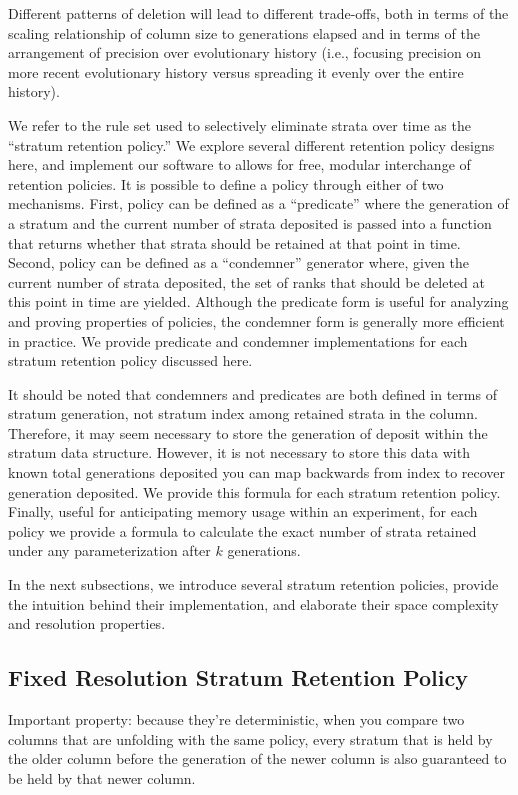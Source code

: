Different patterns of deletion will lead to different trade-offs, both in terms of the scaling relationship of column size to generations elapsed and in terms of the arrangement of precision over evolutionary history (i.e., focusing precision on more recent evolutionary history versus spreading it evenly over the entire history).

We refer to the rule set used to selectively eliminate strata over time as the ``stratum retention policy.''
We explore several different retention policy designs here, and implement our software to allows for free, modular interchange of retention policies.
It is possible to define a policy through either of two mechanisms.
First, policy can be defined as a ``predicate'' where the generation of a stratum and the current number of strata deposited is passed into a function that returns whether that strata should be retained at that point in time.
Second, policy can be defined as a ``condemner'' generator where, given the current number of strata deposited, the set of ranks that should be deleted at this point in time are yielded.
Although the predicate form is useful for analyzing and proving properties of policies, the condemner form is generally more efficient in practice.
We provide predicate and condemner implementations for each stratum retention policy discussed here.

It should be noted that condemners and predicates are both defined in terms of stratum generation, not stratum index among retained strata in the column.
Therefore, it may seem necessary to store the generation of deposit within the stratum data structure.
However, it is not necessary to store this data with known total generations deposited you can map backwards from index to recover generation deposited.
We provide this formula for each stratum retention policy.
Finally, useful for anticipating memory usage within an experiment, for each policy we provide a formula to calculate the exact number of strata retained under any parameterization after $k$ generations.

In the next subsections, we introduce several stratum retention policies, provide the intuition behind their implementation, and elaborate their space complexity and resolution properties.

\subsection{Fixed Resolution Stratum Retention Policy}
Important property: because they're deterministic, when you compare two columns that are unfolding with the same policy, every stratum that is held by the older column before the generation of the newer column is also guaranteed to be held by that newer column.


